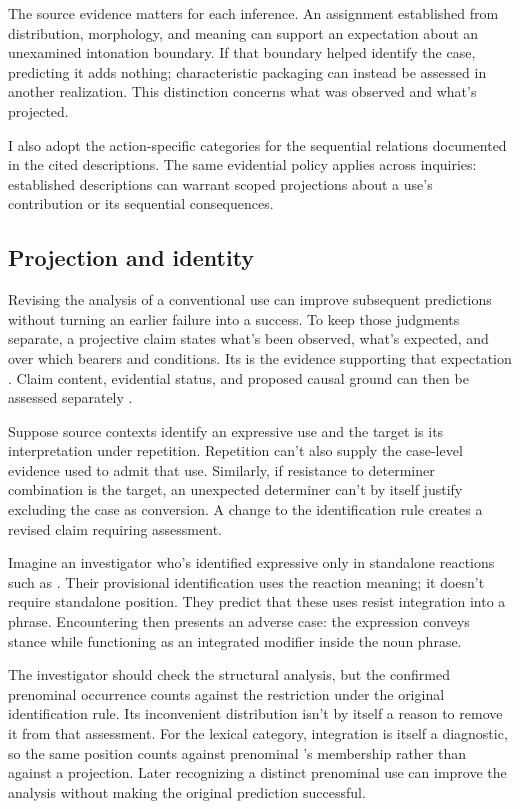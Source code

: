 \documentclass[12pt]{article}
\begin{document}
The source evidence matters for each inference. An assignment established
from distribution, morphology, and meaning can support an expectation about
an unexamined intonation boundary. If that boundary helped identify the case, predicting it
adds nothing; characteristic packaging can instead be assessed in another
realization. This distinction concerns what was observed and what's
projected.

I also adopt the action-specific categories for the sequential relations
documented in the cited descriptions. The same evidential policy applies
across inquiries: established descriptions can warrant scoped projections
about a use's contribution or its sequential consequences.

\subsection{Projection and identity}

Revising the analysis of a conventional use can improve subsequent
predictions without turning an earlier failure into a success. To
keep those judgments separate, a projective claim states what's been
observed, what's expected, and over which bearers and conditions.
Its  is the evidence supporting that expectation
\citep{Goodman1955}. Claim content, evidential status, and proposed causal
ground can then be assessed separately
\citep[11--12]{reynolds2026projectibilityHistory}.

Suppose source contexts identify an expressive use and the target is
its interpretation under repetition. Repetition can't also supply the
case-level evidence used to admit that use. Similarly, if resistance
to determiner combination is the target, an unexpected determiner
can't by itself justify excluding the case as conversion. A change
to the identification rule creates a revised claim requiring assessment.

Imagine an investigator who's identified expressive 
only in standalone reactions such as . Their provisional identification uses the reaction meaning;
it doesn't require standalone position. They predict that these uses
resist integration into a phrase. Encountering  then presents an adverse case: the expression conveys stance
while functioning as an integrated modifier inside the noun phrase.

The investigator should check the structural analysis, but the confirmed
prenominal occurrence counts against the restriction under the original
identification rule. Its inconvenient distribution isn't by itself a
reason to remove it from that assessment. For the lexical category,
integration is itself a diagnostic, so the same position counts against
prenominal 's membership rather than against a projection.
Later recognizing a distinct
prenominal use can improve the analysis without making the original
prediction successful.
\end{document}
